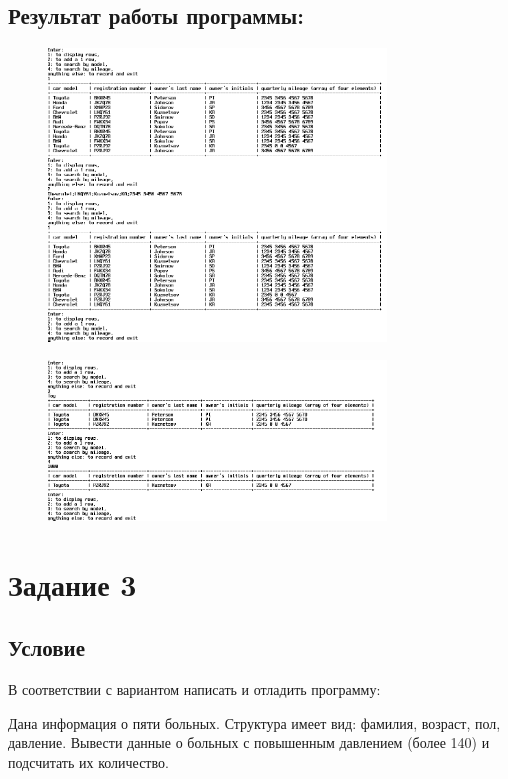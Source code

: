 \documentclass[14pt,a4paper]{article}
\begin{document}
\subsection{Результат работы программы:}
\begin{figure}[h]
  \centering
  \includegraphics[width=0.8\textwidth]{data/demo15_2.png} %
\end{figure}
\begin{figure}[h]
  \centering
  \includegraphics[width=0.8\textwidth]{data/demo15_2_2.png} %
\end{figure}
\newpage

\section*{Задание 3}
\setcounter{subsection}{0}
\subsection{Условие}
В соответствии с вариантом написать и отладить программу:

Дана информация о пяти больных. Структура имеет вид: фамилия, возраст, пол, давление. Вывести данные о больных с повышенным давлением (более 140) и подсчитать их количество.
\end{document}
